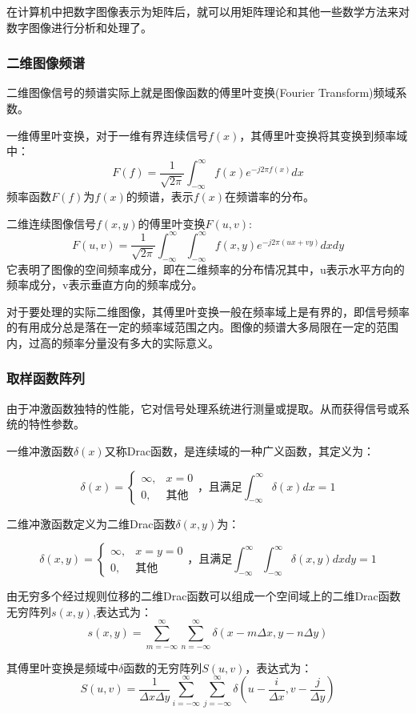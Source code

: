 \documentclass[11pt]{article}
\begin{document}
在计算机中把数字图像表示为矩阵后，就可以用矩阵理论和其他一些数学方法来对数字图像进行分析和处理了。
\subsubsection{二维图像频谱}

二维图像信号的频谱实际上就是图像函数的傅里叶变换(Fourier Transform)频域系数。

一维傅里叶变换，对于一维有界连续信号$f(x)$，其傅里叶变换将其变换到频率域中：
$$F(f) = \frac{1}{\sqrt{2\pi}}\int_{-\infty}^{\infty}f(x)e^{-j2\pi f(x)}dx$$
频率函数$F(f)$为$f(x)$的频谱，表示$f(x)$在频谱率的分布。

二维连续图像信号$f(x,y)$的傅里叶变换$F(u,v)$:
$$F(u,v) = \frac{1}{\sqrt{2\pi}}\int_{-\infty}^{\infty}\int_{-\infty}^{\infty}f(x,y)e^{-j2\pi (ux+vy)}dxdy$$
它表明了图像的空间频率成分，即在二维频率的分布情况其中，u表示水平方向的频率成分，v表示垂直方向的频率成分。

对于要处理的实际二维图像，其傅里叶变换一般在频率域上是有界的，即信号频率的有用成分总是落在一定的频率域范围之内。图像的频谱大多局限在一定的范围内，过高的频率分量没有多大的实际意义。
\subsubsection{取样函数阵列}
由于冲激函数独特的性能，它对信号处理系统进行测量或提取。从而获得信号或系统的特性参数。

一维冲激函数$\delta(x)$又称Drac函数，是连续域的一种广义函数，其定义为：

$$\delta(x)  = \left\{\begin{matrix}
	\infty, &x = 0 \\ 0, &\text{其他}
\end{matrix}\right. \text{，且满足} \int_{-\infty}^{\infty}\delta(x)dx = 1$$

二维冲激函数定义为二维Drac函数$\delta(x,y)$为：

$$\delta(x,y)  = \left\{\begin{matrix}
	\infty, &x = y = 0 \\ 0, &\text{其他}
\end{matrix}\right. \text{，且满足} \int_{-\infty}^{\infty}\int_{-\infty}^{\infty}\delta(x,y)dxdy = 1$$

由无穷多个经过规则位移的二维Drac函数可以组成一个空间域上的二维Drac函数无穷阵列$s(x,y)$,表达式为：
$$s(x,y) = \sum_{m=-\infty}^{\infty}\sum_{n=-\infty}^{\infty}\delta(x - m\Delta x,y - n\Delta y)$$

其傅里叶变换是频域中$\delta$函数的无穷阵列$S(u,v)$，表达式为：
$$S(u,v) = \frac{1}{\Delta x\Delta y}\sum_{i=-\infty}^{\infty}\sum_{j=-\infty}^{\infty}\delta(u - \frac{i}{\Delta x},v - \frac{j}{\Delta y})$$
\end{document}
